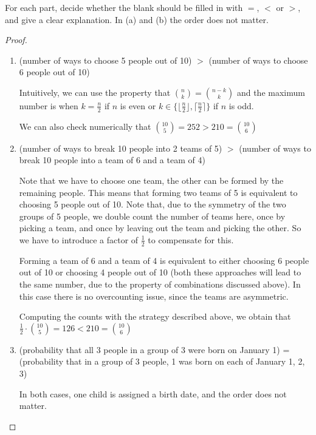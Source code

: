 \begin{exercise}{56}
    For each part, decide whether the blank should be filled in with $=$, $<$ or $>$, and give a clear explanation. In (a) and (b) the order does not matter.
\end{exercise}

\begin{proof}
    \begin{enumerate}
        \item (number of ways to choose 5 people out of 10) $>$ (number of ways to choose 6 people out of 10)

        Intuitively, we can use the property that ${n \choose k} = {n-k \choose k}$ and the maximum number is when $k = \frac{n}{2}$ if $n$ is even or $k \in \{\lfloor\frac{n}{2} \rfloor, \lceil \frac{n}{2} \rceil\}$ if $n$ is odd.

        We can also check numerically that ${10 \choose 5} = 252 > 210 = {10 \choose 6}$

        \item (number of ways to break 10 people into 2 teams of 5) $>$ (number of ways to break 10 people into a team of 6 and a team of 4)

        Note that we have to choose one team, the other can be formed by the remaining people. This means that forming two teams of 5 is equivalent to choosing 5 people out of 10. Note that, due to the symmetry of the two groups of 5 people, we double count the number of teams here, once by picking a team, and once by leaving out the team and picking the other. So we have to introduce a factor of $\frac{1}{2}$ to compensate for this.
        
        Forming a team of 6 and a team of 4 is equivalent to either choosing 6 people out of 10 or choosing 4 people out of 10 (both these approaches will lead to the same number, due to the property of combinations discussed above). In this case there is no overcounting issue, since the teams are asymmetric.

        Computing the counts with the strategy described above, we obtain that $\frac{1}{2} \cdot {10 \choose 5} = 126 < 210 = {10 \choose 6}$

        \item (probability that all 3 people in a group of 3 were born on January 1) = (probability that in a group of 3 people, 1 was born on each of January 1, 2, 3)

        In both cases, one child is assigned a birth date, and the order does not matter.


\end{enumerate}
\end{proof}
